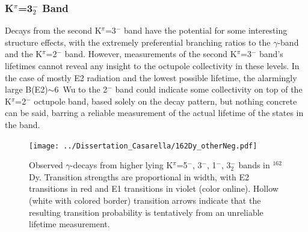 \subsubsection{K$^\pi$=3$^-_2$ Band}
Decays from the second K$^\pi$=3$^-$ band have the potential for some interesting structure effects, with the extremely preferential branching ratios to the $\gamma$-band and the K$^\pi$=2$^-$ band. However, measurements of the second K$^\pi$=3$^-$ band's lifetimes cannot reveal any insight to the octupole collectivity in these levels.  In the case of mostly E2 radiation and the lowest possible lifetime, the alarmingly large B(E2)$\sim$6~Wu to the 2$^-$ band could indicate some collectivity on top of the K$^\pi$=2$^-$ octupole band, based solely on the decay pattern, but nothing concrete can be said, barring a reliable measurement of the actual lifetime of the states in the band.


\begin{landscape}
\begin{figure}[h!]
\begin{center}
\texttt{[image: ../Dissertation\_Casarella/162Dy\_otherNeg.pdf]}
\caption{Observed $\gamma$-decays from higher lying K$^\pi$=5$^-$, 3$^-$, 1$^-$, 3$^-_2$ bands in $^{162}$Dy. Transition strengths are proportional in width, with E2 transitions in red and E1 transitions in violet (color online). Hollow (white with colored border) transition arrows indicate that the resulting transition probability is tentatively from an unreliable lifetime measurement. \label{fig:162Dy_highbands}}
\end{center}
\end{figure}
\end{landscape}

